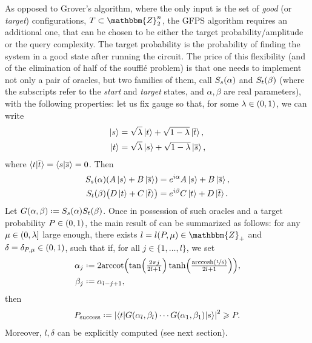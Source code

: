 \documentclass[reqno, 10pt]{amsart}
\numberwithin{equation}{section}                %
\let\originalleft\left
\let\originalright\right
\renewcommand{\left}{\mathopen{}\mathclose\bgroup\originalleft}
\renewcommand{\right}{\aftergroup\egroup\originalright}
\def\({\mathopen{}\left(}
\def\){\right)\mathclose{}}
\newcommand*{\eqdef}{\mathrel{\vcenter{\baselineskip0.5ex \lineskiplimit0pt\hbox{.}\hbox{.}}}=}
\def\Z{\mathbbm{Z}}
\begin{document}
As opposed to Grover's algorithm, where the only input is the set of \emph{good} (or \emph{target}) configurations, $T \subset \Z_2^n$, the GFPS algorithm requires an additional one, that can be chosen to be either the target probability/amplitude or the query complexity. The target probability is the probability of finding the system in a good state after running the circuit. The price of this flexibility (and of the elimination of half of the souffl\'e problem) is that one needs to implement not only a pair of oracles, but two families of them, call $S_s \( \alpha \)$ and $S_t \( \beta \)$ (where the subscripts refer to the \emph{start} and \emph{target} states, and $\alpha, \beta$ are real parameters), with the following properties: let us fix gauge so that, for some $\lambda \in \( 0, 1 \)$, we can write
\begin{align}
   \ket{s}  &= \sqrt{\lambda} \ket{t} + \sqrt{1 - \lambda} \ket{\overline{t}}, \\
   \ket{t}  &= \sqrt{\lambda} \ket{s} + \sqrt{1 - \lambda} \ket{\overline{s}},
\end{align}
where $\braket{t | \overline{t}} = \braket{s | \overline{s}} = 0$. Then
\begin{align}
   S_s \( \alpha \) \( A \ket{s} + B \ket{\overline{s}} \)  &= e^{i \alpha} A \ket{s} + B \ket{\overline{s}}, \\
   S_t \( \beta \) \( D \ket{t} + C \ket{\overline{t}} \)   &= e^{i \beta} C \ket{t} + D \ket{\overline{t}}.
\end{align}
Let $G \( \alpha, \beta \) \eqdef S_s \( \alpha \) S_t \( \beta \)$. Once in possession of such oracles and a target probability $P \in \( 0, 1 \)$, the main result of \cite{yoder_fixed_2014} can be summarized as follows: for any $\mu \in \( 0, \lambda \right]$ large enough, there exists $l = l \( P, \mu \) \in \Z_+$ and $\delta = \delta_{P, \mu} \in \( 0, 1 \)$, such that if, for all $j \in \{ 1, \ldots, l \}$, we set
\begin{align}
   \alpha_j &\eqdef 2 \mathrm{arccot} \( \tan \( \tfrac{2 \pi j}{2 l + 1} \) \tanh \( \tfrac{\mathrm{arccosh} \( \nicefrac{1}{\delta} \)}{2 l + 1} \) \), \\
   \beta_j  &\eqdef \alpha_{l - j + 1},
\end{align}
then
\begin{equation}
   P_{\mathrm{success}} \eqdef \left| \left\langle t \middle| G \( \alpha_l, \beta_l \) \cdots G \( \alpha_1, \beta_1 \) \middle| s \right\rangle \right|^2 \geqslant P.
\end{equation}
Moreover, $l, \delta$ can be explicitly computed (see next section).
\end{document}
